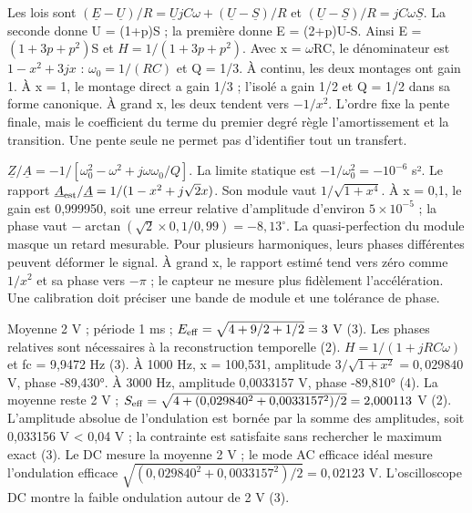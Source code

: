 Les lois sont $(\underline E-\underline U)/R=\underline UjC\omega+(\underline U-\underline S)/R$ et $(\underline U-\underline S)/R=jC\omega\underline S$. La seconde donne U = (1+p)S ; la première donne E = (2+p)U-S. Ainsi E = $(1+3p+p^2)$S et $H=1/(1+3p+p^2)$. Avec x = \ensuremath{\omega}RC, le dénominateur est $1-x^2+3jx$ : $\omega_0=1/(RC)$ et Q = 1/3. À continu, les deux montages ont gain 1. À x = 1, le montage direct a gain 1/3 ; l’isolé a gain 1/2 et Q = 1/2 dans sa forme canonique. À grand x, les deux tendent vers $-1/x^2$. L’ordre fixe la pente finale, mais le coefficient du terme du premier degré règle l’amortissement et la transition. Une pente seule ne permet pas d’identifier tout un transfert.

$\underline Z/\underline A=-1/[\omega_0^2-\omega^2+j\omega\omega_0/Q]$. La limite statique est $-1/\omega_0^2=-10^{-6}$ s². Le rapport $\underline A_{\rm est}/\underline A=1/(1-x^2+j\sqrt2x)$. Son module vaut $1/\sqrt{1+x^4}$. À x = 0,1, le gain est 0,999950, soit une erreur relative d’amplitude d’environ $5\times10^{-5}$ ; la phase vaut $-\arctan(\sqrt2\times0{,}1/0{,}99)=-8{,}13^\circ$. La quasi-perfection du module masque un retard mesurable. Pour plusieurs harmoniques, leurs phases différentes peuvent déformer le signal. À grand x, le rapport estimé tend vers zéro comme $1/x^2$ et sa phase vers $-\pi$ ; le capteur ne mesure plus fidèlement l’accélération. Une calibration doit préciser une bande de module et une tolérance de phase.

Moyenne 2 V ; période 1 ms ; $E_{\rm eff}=\sqrt{4+9/2+1/2}=3$ V (3). Les phases relatives sont nécessaires à la reconstruction temporelle (2).
$H=1/(1+jRC\omega)$ et fc = 9,9472 Hz (3). À 1000 Hz, x = 100,531, amplitude $3/\sqrt{1+x^2}=0{,}029840$ V, phase -89,430°. À 3000 Hz, amplitude 0,0033157 V, phase -89,810° (4). La moyenne reste 2 V ; $S_{\rm eff}=\sqrt{4+(0{,}029840^2+0{,}0033157^2)/2}=2{,}000113$ V (2).
L’amplitude absolue de l’ondulation est bornée par la somme des amplitudes, soit 0,033156 V < 0,04 V ; la contrainte est satisfaite sans rechercher le maximum exact (3). Le DC mesure la moyenne 2 V ; le mode AC efficace idéal mesure l’ondulation efficace $\sqrt{(0{,}029840^2+0{,}0033157^2)/2}=0{,}02123$ V. L’oscilloscope DC montre la faible ondulation autour de 2 V (3).


